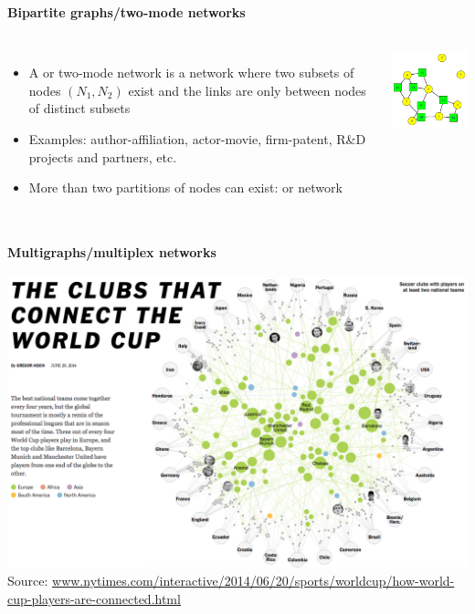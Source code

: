 \documentclass[8pt]{beamer}
\begin{document}

\begin{frame}
\frametitle{\insertsection}
\framesubtitle{Bipartite graphs/two-mode networks}


\begin{columns}[c]
\begin{itemize}
	\item A {\color{blue}{bipartite graph}} or two-mode network is a network where two subsets of nodes $(N_1, N_2)$ exist and the links are only between nodes of distinct subsets
	\item Examples: author-affiliation, actor-movie, firm-patent, R\&D projects and partners, etc.
	\item More than two partitions of nodes can exist: {\color{blue}{s-partite graph}} or {\color{blue}{s-mode}} network
\end{itemize}

\centering
\includegraphics[width=5cm]{bipartite}
\end{columns}

\end{frame}


\begin{frame}
\frametitle{\insertsection}
\framesubtitle{Multigraphs/multiplex networks}

\centering
\includegraphics[width=\linewidth, height=0.8\textheight,keepaspectratio]{soccer_3mode}\\
\tiny{Source: \url{www.nytimes.com/interactive/2014/06/20/sports/worldcup/how-world-cup-players-are-connected.html}}
	
\end{frame}
 
\end{document}

